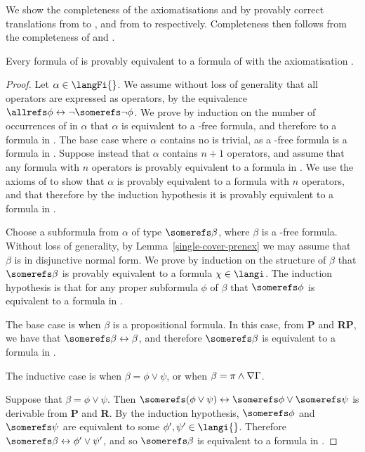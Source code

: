 We show the completeness of the axiomatisations \axiomSiF{} and \axiomKDiF{} by
provably correct translations from \logicSiF{} to \logicSi{}, and from
\logicKDiF{} to \logicKDi{} respectively. Completeness then follows from the
completeness of \logicSi{} and \logicKDi{}.

\begin{lemma}\label{single-reduction-s5}
Every formula of \langFi{} is provably equivalent to a formula of \langi{} with
the axiomatisation \axiomSiF{}.
\end{lemma}

\begin{proof}
Let $\alpha \in \langFi{}$. We assume without loss of generality that all
\allrefs{} operators are expressed as \somerefs{} operators, by the equivalence
$\allrefs \phi \iff \neg \somerefs \neg \phi$. We prove by induction on the
number of occurrences of \somerefs{} in $\alpha$ that $\alpha$ is equivalent to
a \somerefs{}-free formula, and therefore to a formula in \langi{}. The base case
where $\alpha$ contains no \somerefs{} is trivial, as a \somerefs{}-free formula
is a formula in \langi{}. Suppose instead that $\alpha$ contains $n + 1$
\somerefs{} operators, and assume that any formula with $n$ \somerefs{}
operators is provably equivalent to a formula in \langi{}. We use the axioms of
\axiomSiF{} to show that $\alpha$ is provably equivalent to a formula with $n$
\somerefs{} operators, and that therefore by the induction hypothesis it is
provably equivalent to a formula in \langi{}.

Choose a subformula from $\alpha$ of type $\somerefs \beta$, where $\beta$ is a
\somerefs{}-free formula. Without loss of generality, by
Lemma~\ref{single-cover-prenex} we may assume that $\beta$ is in disjunctive
normal form. We prove by induction on the structure of $\beta$ that $\somerefs
\beta$ is provably equivalent to a formula $\chi \in \langi$. The induction
hypothesis is that for any proper subformula $\phi$ of $\beta$ that $\somerefs
\phi$ is equivalent to a formula in \langi{}.

The base case is when $\beta$ is a propositional formula. In this case, from
{\bf P} and {\bf RP}, we have that $\somerefs \beta \iff \beta$, and therefore
$\somerefs \beta$ is equivalent to a formula in \langi{}.

The inductive case is when $\beta = \phi \lor \psi$, or when $\beta = \pi \land
\nabla \Gamma$. 

Suppose that $\beta = \phi \lor \psi$. Then $\somerefs (\phi \lor \psi) \iff
\somerefs \phi \lor \somerefs \psi$ is derivable from {\bf P} and {\bf R}. By
the induction hypothesis, $\somerefs \phi$ and $\somerefs \psi$ are equivalent
to some $\phi', \psi' \in \langi{}$. Therefore $\somerefs \beta \iff \phi' \lor
\psi'$, and so $\somerefs \beta$ is equivalent to a formula in \langi{}.


\end{proof}
